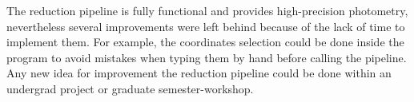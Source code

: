 The reduction pipeline is fully functional and provides high-precision photometry, nevertheless several improvements were left behind because of the lack of time to implement them. For example, the coordinates selection could be done inside the program to avoid mistakes when typing them by hand before calling the pipeline. Any new idea for improvement the reduction pipeline could be done within an undergrad project or graduate semester-workshop.
 